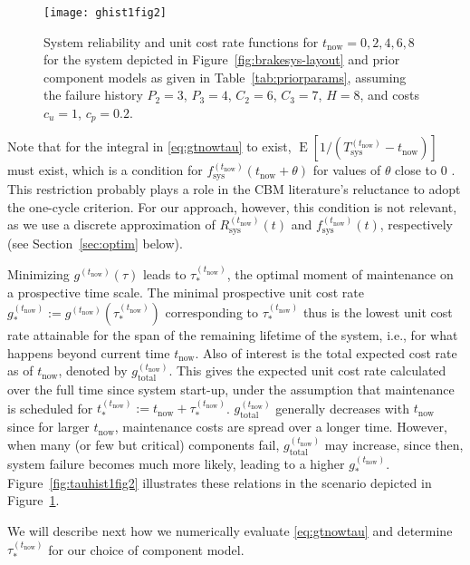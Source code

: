 \documentclass[authoryear]{elsarticle}
\newcommand{\E}{\operatorname{E}}
\def\tnow{t_\text{now}}
\newcommand{\Rsysnow}{R^{(t_\text{now})}_\text{sys}}
\newcommand{\Tsysnow}{T^{(t_\text{now})}_\text{sys}}
\newcommand{\fsysnow}{f^{(t_\text{now})}_\text{sys}}
\newcommand{\gnow}{g^{(\tnow)}}
\newcommand{\tausnow}{\tau_*^{(\tnow)}}
\newcommand{\tstarnow}{t_*^{(\tnow)}}
\newcommand{\gstarnow}{g_*^{(\tnow)}}
\newcommand{\gtotalnow}{g_\text{total}^{(\tnow)}}
\begin{document}
\begin{figure}
\texttt{[image: ghist1fig2]}
\caption{System reliability and unit cost rate functions for $\tnow = 0,2,4,6,8$
for the system depicted in Figure~\ref{fig:brakesys-layout}
and prior component models as given in Table~\ref{tab:priorparams},
assuming the failure history $P_2 = 3$, $P_3 = 4$, $C_2 = 6$, $C_3 = 7$, $H = 8$,
and costs $c_u = 1$, $c_p = 0.2$.}
\label{fig:ghist1fig2}
\end{figure}

Note that for the integral in \eqref{eq:gtnowtau} to exist,
$\E[1/(\Tsysnow - \tnow)]$ must exist,
which is a condition for $\fsysnow(\tnow + \theta)$ for values of $\theta$ close to $0$ \citep{2006:coolen-schrijner-coolen}.
This restriction probably plays a role in the CBM literature's reluctance to adopt the one-cycle criterion.
For our approach, however, this condition is not relevant,
as we use a discrete approximation of $\Rsysnow(t)$ and $\fsysnow(t)$, respectively
(see Section~\ref{sec:optim} below).

Minimizing $\gnow(\tau)$ leads to $\tausnow$,
the optimal moment of maintenance on a prospective time scale.
The minimal prospective unit cost rate $\gstarnow := \gnow(\tausnow)$ corresponding to $\tausnow$
thus is the lowest unit cost rate attainable for the span of the remaining lifetime of the system,
i.e., for what happens beyond current time $\tnow$.
Also of interest is the total expected cost rate as of $\tnow$, denoted by $\gtotalnow$.
This gives the expected unit cost rate calculated over the full time since system start-up,
under the assumption that maintenance is scheduled for $\tstarnow := \tnow + \tausnow$.
$\gtotalnow$ generally decreases with $\tnow$ since for larger $\tnow$, maintenance costs are spread over a longer time.
However, when many (or few but critical) components fail, $\gtotalnow$ may increase,
since then, system failure becomes much more likely, leading to a higher $\gstarnow$.
Figure~\ref{fig:tauhist1fig2} illustrates these relations in the scenario depicted in Figure~\ref{fig:ghist1fig2}.

We will describe next how we numerically evaluate \eqref{eq:gtnowtau} and determine $\tausnow$
for our choice of component model.
\end{document}
